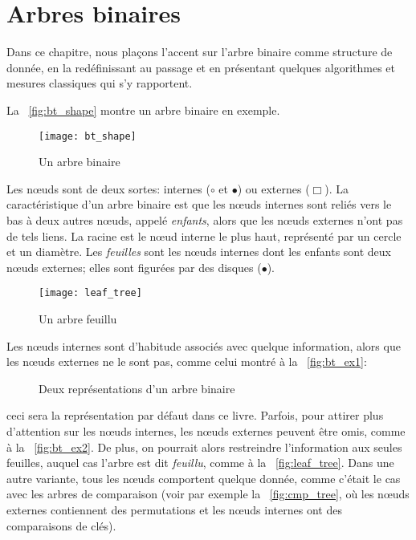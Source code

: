 \chapter{Arbres binaires}

Dans ce chapitre, nous plaçons l'accent sur l'arbre binaire
comme structure de donnée, en la redéfinissant au passage et en
présentant quelques algorithmes et mesures classiques qui s'y
rapportent.

La \fig~\vref{fig:bt_shape} montre un arbre binaire en exemple.
\begin{figure}
\centering
\texttt{[image: bt\_shape]}
\caption{Un arbre binaire}
\label{fig:bt_shape}
\end{figure}
Les nœuds sont de deux sortes: internes (\(\circ\) et \(\bullet\)) ou
externes (\(\scriptstyle
\Box\)). La caractéristique d'un arbre binaire est que les nœuds
internes sont reliés vers le bas à deux autres nœuds, appelé
\emph{enfants}, alors que les nœuds
externes n'ont pas de tels liens. La
racine est le nœud interne le plus
haut, représenté par un cercle et un diamètre. Les
\emph{feuilles} sont les nœuds
internes dont les enfants sont deux nœuds externes; elles sont
figurées par des disques (\(\bullet\)).

%
\begin{wrapfigure}[8]{r}[0pt]{0pt}
\centering
\texttt{[image: leaf\_tree]}%
\caption{Un arbre feuillu}
\label{fig:leaf_tree}
\end{wrapfigure}
Les nœuds internes sont d'habitude associés avec quelque
information, alors que les nœuds externes ne le sont pas, comme
celui montré à la \fig~\vref{fig:bt_ex1}:
\begin{figure}
\centering
{}
\qquad
{}
\caption{Deux représentations d'un arbre binaire}
\label{fig:bt_ex}
\end{figure}
ceci sera la représentation par défaut dans ce livre. Parfois, pour
attirer plus d'attention sur les nœuds internes, les nœuds
externes peuvent être omis, comme à la \fig~\vref{fig:bt_ex2}. De
plus, on pourrait alors restreindre l'information aux seules feuilles,
auquel cas l'arbre est dit \emph{feuillu}, comme à la \fig~\vref{fig:leaf_tree}. Dans une autre
variante, tous les nœuds comportent quelque donnée, comme c'était
le cas avec les arbres de comparaison (voir par exemple la
\fig~\vref{fig:cmp_tree}, où les nœuds externes contiennent des
permutations et les nœuds internes ont des comparaisons de clés).

